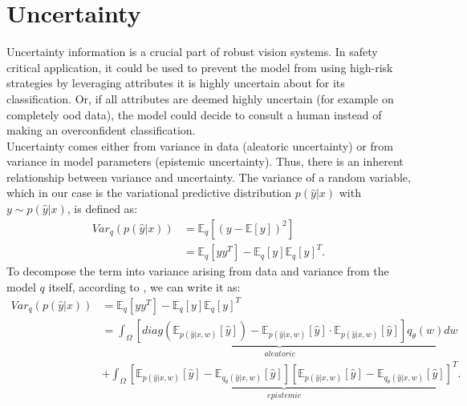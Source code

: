 \documentclass[a4paper,cleardoubleempty,BCOR1cm, 11pt]{report}
\begin{document}
\section{Uncertainty}
Uncertainty information is a crucial part of robust vision systems. In safety critical application, it could be used to prevent the model from using high-risk strategies by leveraging attributes it is highly uncertain about for its classification. Or, if all attributes are deemed highly uncertain (for example on completely ood data), the model could decide to consult a human instead of making an overconfident classification.\\
Uncertainty comes either from variance in data (aleatoric uncertainty) or from variance in model parameters (epistemic uncertainty). Thus, there is an inherent relationship between variance and uncertainty.
The variance of a random variable, which in our case is the variational predictive distribution $p(\hat{y} | x)$ with $y\sim p(\hat{y} | x)$, is defined as:
\begin{align}
	Var_q(p(\hat{y} | x)) &= \mathbb{E}_q \left[ (y-\mathbb{E}\left[ y\right])^2 \right]\\
	&= \mathbb{E}_q \left[yy^T\right]  - \mathbb{E}_q\left[y\right]\mathbb{E}_q\left[y\right]^T.
\end{align}
To decompose the term into variance arising from data and variance from the model $q$ itself, according to \citet{kwon2020uncertainty}, we can write it as:
\begin{align}
Var_q(p(\hat{y} | x)) &= \mathbb{E}_q \left[yy^T\right]  - \mathbb{E}_q\left[y\right]\mathbb{E}_q\left[y\right]^T\\
	&\underbrace{=\int_{\Omega}\left[ diag (\mathbb{E}_{p(\hat{y}|x,w)}[\hat{y}]) -\mathbb{E}_{p(\hat{y}|x,w)}[\hat{y}] \cdot \mathbb{E}_{p(\hat{y}|x,w)}[\hat{y}] \right]q_{\theta}(w)dw}_{aleatoric}\\
	&+\underbrace{\int_{\Omega}\left[ \mathbb{E}_{p(\hat{y}|x,w)}[\hat{y}] - \mathbb{E}_{q_{\theta}(\hat{y}|x,w)}[\hat{y}] \right] \left[ \mathbb{E}_{p(\hat{y}|x,w)}[\hat{y}] - \mathbb{E}_{q_{\theta}(\hat{y}|x,w)}[\hat{y}] \right]^T}_{epistemic}.
\end{align}
\end{document}
